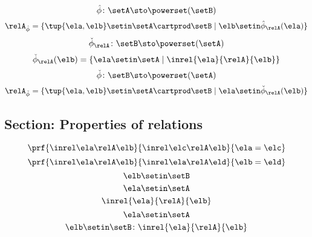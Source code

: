 \begin{forslides}
\begin{equation}
\hat \phi \colon \setA \sto \powerset (\setB)
\end{equation}
 \begin{equation}\label{eq:slides_session2_121}
\relA_{\hat \phi} = \{ \tup{\ela, \elb} \setin \setA \cartprod \setB \mid \elb \setin \hat \phi_{\relA}(\ela)   \}
\end{equation}
\begin{equation}\label{eq:slides_session2_122}
\check \phi_{\relA} \colon \setB \sto \powerset (\setA)
\end{equation}
 \begin{equation}\label{eq:slides_session2_123}
\check \phi_{\relA} (\elb) = \{ \ela \setin \setA \mid \inrel{\ela}{\relA}{\elb}\}
\end{equation}
\begin{equation}\label{eq:slides_session2_124}
\check \phi \colon \setB \sto \powerset (\setA)
\end{equation}
 \begin{equation}\label{eq:slides_session2_125}
 \relA_{\check \phi} = \{ \tup{\ela, \elb} \setin \setA \cartprod \setB \mid \ela \setin \check \phi_{\relA}(\elb)\}
\end{equation}

\subsection{Section: Properties of relations}


\begin{equation}\label{eq:slides_session2_126}
\prf{
                      \inrel \ela \relA \elb
                  }{
                      \inrel \elc \relA \elb
                  }{
                      \ela=\elc
                  }
\end{equation}
 \begin{equation}\label{eq:slides_session2_127}
 \prf{
                      \inrel \ela \relA \elb
                  }{
                      \inrel \ela \relA \eld
                  }{
                      \elb = \eld
                  }
\end{equation}
\begin{equation}\label{eq:slides_session2_128}
\elb\setin \setB
\end{equation}
 \begin{equation}\label{eq:slides_session2_129}
\ela\setin \setA
\end{equation}
\begin{equation}\label{eq:slides_session2_130}
\inrel{\ela}{\relA}{\elb}
\end{equation}
 \begin{equation}\label{eq:slides_session2_131}
\ela\setin \setA
\end{equation}
\begin{equation}\label{eq:slides_session2_132}
\elb \setin \setB\colon \inrel{\ela}{\relA}{\elb}
\end{equation}


\end{forslides}
